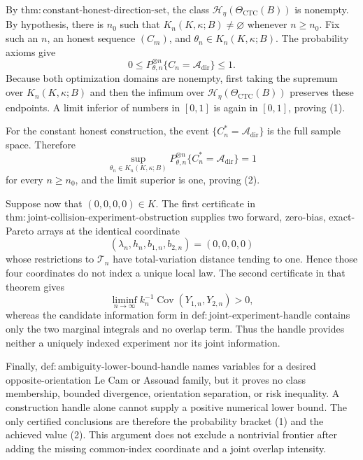 By \(\mathrm{thm{:}constant\text{-}honest\text{-}direction\text{-}set}\), the class \(\mathcal H_\eta(\Theta_{\mathrm{CTC}}(B))\) is nonempty.  By hypothesis, there is \(n_0\) such that \(K_n(K,\kappa;B)\neq\varnothing\) whenever \(n\geq n_0\).  Fix such an \(n\), an honest sequence \((C_m)\), and \(\theta_n\in K_n(K,\kappa;B)\).  The probability axioms give
\[
 0\leq P_{\theta,n}^{\otimes n}\{C_n=\mathcal A_{\mathrm{dir}}\}\leq1.
\]
Because both optimization domains are nonempty, first taking the supremum over \(K_n(K,\kappa;B)\) and then the infimum over \(\mathcal H_\eta(\Theta_{\mathrm{CTC}}(B))\) preserves these endpoints.  A limit inferior of numbers in \([0,1]\) is again in \([0,1]\), proving (1).

For the constant honest construction, the event \(\{C_n^*=\mathcal A_{\mathrm{dir}}\}\) is the full sample space.  Therefore
\[
 \sup_{\theta_n\in K_n(K,\kappa;B)}
 P_{\theta,n}^{\otimes n}\{C_n^*=\mathcal A_{\mathrm{dir}}\}=1
\]
for every \(n\geq n_0\), and the limit superior is one, proving (2).

Suppose now that \((0,0,0,0)\in K\).  The first certificate in \(\mathrm{thm{:}joint\text{-}collision\text{-}experiment\text{-}obstruction}\) supplies two forward, zero-bias, exact-Pareto arrays at the identical coordinate
\[
 (\lambda_n,h_n,b_{1,n},b_{2,n})=(0,0,0,0)
\]
whose restrictions to \(\mathcal T_n\) have total-variation distance tending to one.  Hence those four coordinates do not index a unique local law.  The second certificate in that theorem gives
\[
 \liminf_{n\to\infty}k_n^{-1}
 \operatorname{Cov}(Y_{1,n},Y_{2,n})>0,
\]
whereas the candidate information form in \(\mathrm{def{:}joint\text{-}experiment\text{-}handle}\) contains only the two marginal integrals and no overlap term.  Thus the handle provides neither a uniquely indexed experiment nor its joint information.

Finally, \(\mathrm{def{:}ambiguity\text{-}lower\text{-}bound\text{-}handle}\) names variables for a desired opposite-orientation Le Cam or Assouad family, but it proves no class membership, bounded divergence, orientation separation, or risk inequality.  A construction handle alone cannot supply a positive numerical lower bound.  The only certified conclusions are therefore the probability bracket (1) and the achieved value (2).  This argument does not exclude a nontrivial frontier after adding the missing common-index coordinate and a joint overlap intensity.